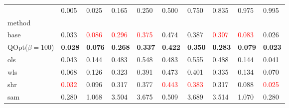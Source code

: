 \begin{tabular}{llllllllll}
\toprule
 & 0.005 & 0.025 & 0.165 & 0.250 & 0.500 & 0.750 & 0.835 & 0.975 & 0.995 \\
method &  &  &  &  &  &  &  &  &  \\
\midrule
base & 0.033 & \textcolor{red}{0.086} & \textcolor{red}{0.296} & \textcolor{red}{0.375} & 0.474 & 0.387 & \textcolor{red}{0.307} & \textcolor{red}{0.083} & 0.026 \\
\midrule
QOpt($\beta=100$) & \textbf{0.028} & \textbf{0.076} & \textbf{0.268} & \textbf{0.337} & \textbf{0.422} & \textbf{0.350} & \textbf{0.283} & \textbf{0.079} & \textbf{0.023} \\
ols & 0.043 & 0.144 & 0.483 & 0.548 & 0.483 & 0.555 & 0.488 & 0.144 & 0.041 \\
wls & 0.068 & 0.126 & 0.323 & 0.391 & 0.473 & 0.401 & 0.335 & 0.134 & 0.070 \\
shr & \textcolor{red}{0.032} & 0.096 & 0.317 & 0.377 & \textcolor{red}{0.443} & \textcolor{red}{0.383} & 0.317 & 0.088 & \textcolor{red}{0.025} \\
sam & 0.280 & 1.068 & 3.504 & 3.675 & 0.509 & 3.689 & 3.514 & 1.070 & 0.280 \\
\bottomrule
\end{tabular}